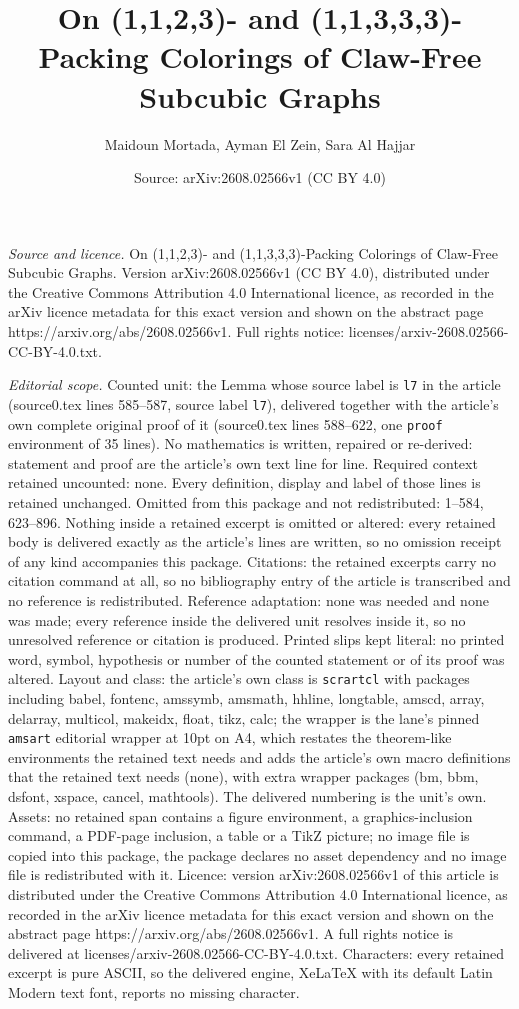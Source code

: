 \documentclass[10pt,a4paper]{amsart}
\title[On (1,1,2,3)- and (1,1,3,3,3)-Packing Colorings of Claw-Free]{On (1,1,2,3)- and (1,1,3,3,3)-Packing Colorings of Claw-Free Subcubic Graphs}
\author{Maidoun Mortada, Ayman El Zein, Sara Al Hajjar}
\date{Source: arXiv:2608.02566v1 (CC BY 4.0)}
\begin{document}
\maketitle

\noindent\emph{Source and licence.} On (1,1,2,3)- and (1,1,3,3,3)-Packing Colorings of Claw-Free Subcubic Graphs. Version arXiv:2608.02566v1 (CC BY 4.0), distributed under the Creative Commons Attribution 4.0 International licence, as recorded in the arXiv licence metadata for this exact version and shown on the abstract page https://arxiv.org/abs/2608.02566v1. Full rights notice: licenses/arxiv-2608.02566-CC-BY-4.0.txt.\par\smallskip

\noindent\textit{Editorial scope.} Counted unit: the Lemma whose source label is \texttt{l7} in the article (source0.tex lines 585--587, source label \texttt{l7}), delivered together with the article's own complete original proof of it (source0.tex lines 588--622, one \texttt{proof} environment of 35 lines). No mathematics is written, repaired or re-derived: statement and proof are the article's own text line for line. Required context retained uncounted: none. Every definition, display and label of those lines is retained unchanged. Omitted from this package and not redistributed: 1--584, 623--896. Nothing inside a retained excerpt is omitted or altered: every retained body is delivered exactly as the article's lines are written, so no omission receipt of any kind accompanies this package. Citations: the retained excerpts carry no citation command at all, so no bibliography entry of the article is transcribed and no reference is redistributed. Reference adaptation: none was needed and none was made; every reference inside the delivered unit resolves inside it, so no unresolved reference or citation is produced. Printed slips kept literal: no printed word, symbol, hypothesis or number of the counted statement or of its proof was altered. Layout and class: the article's own class is \texttt{scrartcl} with packages including babel, fontenc, amssymb, amsmath, hhline, longtable, amscd, array, delarray, multicol, makeidx, float, tikz, calc; the wrapper is the lane's pinned \texttt{amsart} editorial wrapper at 10pt on A4, which restates the theorem-like environments the retained text needs and adds the article's own macro definitions that the retained text needs (none), with extra wrapper packages (bm, bbm, dsfont, xspace, cancel, mathtools). The delivered numbering is the unit's own. Assets: no retained span contains a figure environment, a graphics-inclusion command, a PDF-page inclusion, a table or a TikZ picture; no image file is copied into this package, the package declares no asset dependency and no image file is redistributed with it. Licence: version arXiv:2608.02566v1 of this article is distributed under the Creative Commons Attribution 4.0 International licence, as recorded in the arXiv licence metadata for this exact version and shown on the abstract page https://arxiv.org/abs/2608.02566v1. A full rights notice is delivered at licenses/arxiv-2608.02566-CC-BY-4.0.txt. Characters: every retained excerpt is pure ASCII, so the delivered engine, XeLaTeX with its default Latin Modern text font, reports no missing character.
\end{document}
